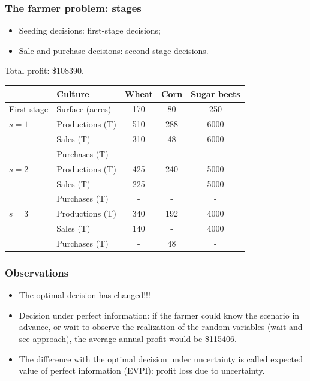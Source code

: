\documentclass{beamer}
\def\blue{\color{blue}}
\def\red{\color{red}}
\begin{document}
\begin{frame}
\frametitle{The farmer problem: stages}

\begin{itemize}
	\item 
Seeding decisions: {\red first-stage decisions};
	\item 
Sale and purchase decisions: {\red second-stage decisions}.
\end{itemize}

Total profit: \$108390.
\begin{center}
\begin{tabular}{llccc}
\hline
& Culture & Wheat & Corn & Sugar beets \\
\hline
First stage & Surface (acres) & 170 & 80 & 250 \\
\hline
$s = 1$ & Productions (T) & 510 & 288 & 6000 \\
& Sales (T) & 310 & 48 & 6000 \\
& Purchases (T) & - & - & - \\
\hline
$s = 2$ & Productions (T) & 425 & 240 & 5000 \\
& Sales (T) & 225 & - & 5000 \\
& Purchases (T) & - & - & - \\
\hline
$s = 3$ & Productions (T) & 340 & 192 & 4000 \\
& Sales (T) & 140 & - & 4000 \\
& Purchases (T) & - & 48 & - \\
\hline
\end{tabular}
\end{center}

\end{frame}

\begin{frame}
\frametitle{Observations}

\begin{itemize}
	\item 
The optimal decision has changed!!!
\item
Decision under {\red perfect information}:
if the farmer could know the scenario in advance, or wait to observe the realization of the random variables ({\red wait-and-see} approach),
the average annual profit would be \$115406.
\item
The difference with the optimal decision under uncertainty is called {\blue expected value of perfect information (EVPI)}: profit loss due to uncertainty. 
\end{itemize}

\end{frame}
\end{document}
